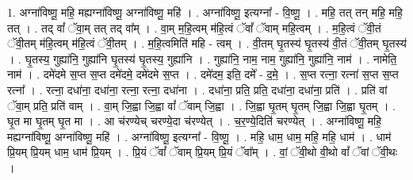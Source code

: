 \documentclass[17pt]{extarticle}
\begin{document}
1. अग्ना॑विष्णू॒ महि॒ मह्यग्ना॑विष्णू॒ अग्ना॑विष्णू॒ महि॑ । . अग्ना॑विष्णू॒ इत्यग्ना᳚ - वि॒ष्णू॒ । . महि॒ तत् तन् महि॒ महि॒ तत् । . तद् वां᳚ ॅवा॒म् तत् तद् वा᳚म् । . वा॒म् म॒हि॒त्वम् म॑हि॒त्वं ॅवां᳚ ॅवाम् महि॒त्वम् । . म॒हि॒त्वं ॅवी॒तं ॅवी॒तम् म॑हि॒त्वम् म॑हि॒त्वं ॅवी॒तम् । . म॒हि॒त्वमिति॑ महि - त्वम् । . वी॒तम् घृ॒तस्य॑ घृ॒तस्य॑ वी॒तं ॅवी॒तम् घृ॒तस्य॑ । . घृ॒तस्य॒ गुह्या॑नि॒ गुह्या॑नि घृ॒तस्य॑ घृ॒तस्य॒ गुह्या॑नि । . गुह्या॑नि॒ नाम॒ नाम॒ गुह्या॑नि॒ गुह्या॑नि॒ नाम॑ । . नामेति॒ नाम॑ । . दमे॑दमे स॒प्त स॒प्त दमे॑दमे॒ दमे॑दमे स॒प्त । . दमे॑दम॒ इति॒ दमे᳚ - द॒मे॒ । . स॒प्त रत्ना॒ रत्ना॑ स॒प्त स॒प्त रत्ना᳚ । . रत्ना॒ दधा॑ना॒ दधा॑ना॒ रत्ना॒ रत्ना॒ दधा॑ना । . दधा॑ना॒ प्रति॒ प्रति॒ दधा॑ना॒ दधा॑ना॒ प्रति॑ । . प्रति॑ वां ॅवा॒म् प्रति॒ प्रति॑ वाम् । . वा॒म् जि॒ह्वा जि॒ह्वा वां᳚ ॅवाम् जि॒ह्वा । . जि॒ह्वा घृ॒तम् घृ॒तम् जि॒ह्वा जि॒ह्वा घृ॒तम् । . घृ॒त मा घृ॒तम् घृ॒त मा । . आ च॑रण्येच् चरण्ये॒दा च॑रण्येत् । . च॒र॒ण्ये॒दिति॑ चरण्येत् । . अग्ना॑विष्णू॒ महि॒ मह्यग्ना॑विष्णू॒ अग्ना॑विष्णू॒ महि॑ । . अग्ना॑विष्णू॒ इत्यग्ना᳚ - वि॒ष्णू॒ । . महि॒ धाम॒ धाम॒ महि॒ महि॒ धाम॑ । . धाम॑ प्रि॒यम् प्रि॒यम् धाम॒ धाम॑ प्रि॒यम् । . प्रि॒यं ॅवां᳚ ॅवाम् प्रि॒यम् प्रि॒यं ॅवा᳚म् । . वां॒ ॅवी॒थो वी॒थो वां᳚ ॅवां ॅवी॒थः । \newline
\end{document}
